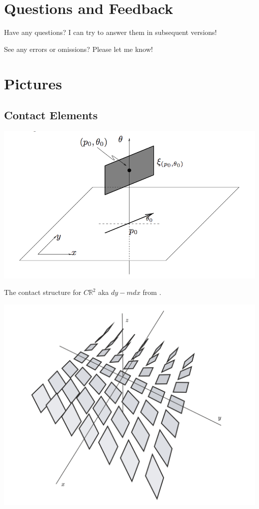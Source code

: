 \documentclass{article}
\begin{document}
\newpage

\section {Questions and Feedback}

Have any questions? I can try to answer them in subsequent versions!

See any errors or omissions? Please let me know!

\newpage

\section {Pictures}

\subsection {Contact Elements}

\includegraphics[scale=0.8]{geiges_contact_structure}

The contact structure for $C\mathbb{R}^{2}$ aka $dy - mdx$ from \cite{geiges}.

\includegraphics[scale=0.3]{contact_elements_bachman}
\end{document}
